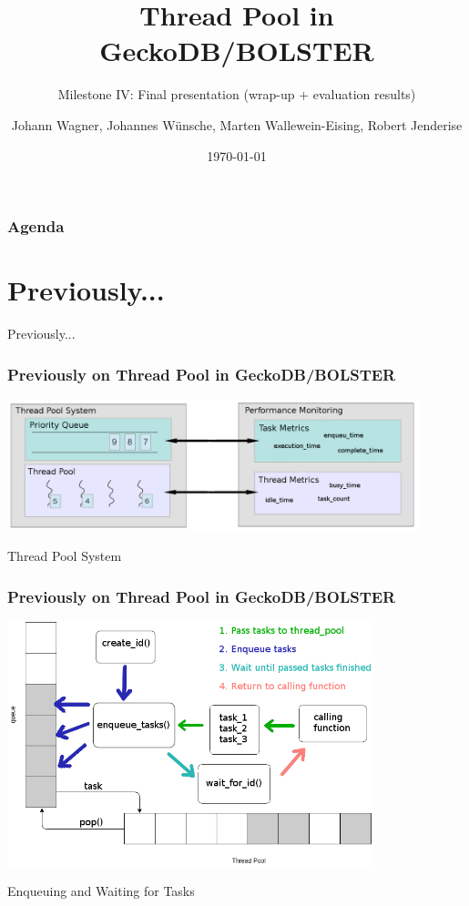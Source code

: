 \documentclass{beamer}
\title{Thread Pool in GeckoDB/BOLSTER}
\subtitle{Milestone IV: Final presentation (wrap-up + evaluation results) }
\author{Johann Wagner, Johannes Wünsche, Marten Wallewein-Eising, Robert Jenderise}
\date{\today}
\institute{Otto von Guericke University, Magdeburg}
\begin{document}
\begin{frame}[plain]
 \titlepage
\end{frame}

\section[Agenda]{}
	\begin{frame}
	\frametitle{Agenda}
	\tableofcontents
	\end{frame}

\section{Previously...}
\begin{frame}
	\begin{center}
		\huge Previously...
	\end{center}
\end{frame}

\begin{frame}
	\frametitle{Previously on Thread Pool in GeckoDB/BOLSTER}
	\begin{center}
		\includegraphics[width=0.9\textwidth]{img/pool_structure.png}
	\end{center}
	\begin{center}
		Thread Pool System
	\end{center}
\end{frame}

\begin{frame}
	\frametitle{Previously on Thread Pool in GeckoDB/BOLSTER}
	\begin{center}
		\includegraphics[width=0.8\textwidth]{img/pool_queue.png}
	\end{center}
	\begin{center}
		Enqueuing and Waiting for Tasks
	\end{center}
\end{frame}
\end{document}
